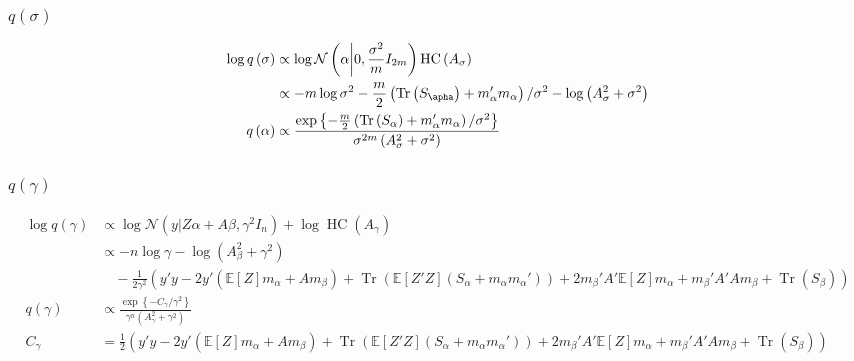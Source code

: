 \documentclass[11pt]{article}
\DeclareMathOperator{\Tr}{Tr}
\newcommand{\opn}{\operatorname}
\begin{document}
\subsubsection{$q\left(\sigma\right)$}
\begin{align*}
  \log q\left(\sigma\right) &\propto \log\mathcal{N}\left(\alpha \middle|0, \frac{\sigma^{2}}{m}I_{2m}\right)\opn{HC}\left(A_{\sigma}\right)\\
  &\propto -m\log \sigma^{2} -\frac{m}{2}\left(\Tr \left(S_{\apha}\right) +m_{\alpha}'m_{\alpha}\right)/\sigma^{2} -\log \left(A_{\sigma}^{2}+\sigma^{2}\right)\\
  q\left(\alpha\right) &\propto \frac{\exp\left\{-\frac{m}{2}\left(\Tr\left(S_{\alpha}\right) +m_{\alpha}'m_{\alpha} \right)/\sigma^{2} \right\}}{\sigma^{2m}\left(A_{\sigma}^{2}+\sigma^{2}\right)}
\end{align*}
\subsubsection{$q\left(\gamma\right)$}
\begin{align*}
  \log q\left(\gamma\right) &\propto \log \mathcal{N}\left(y|Z\alpha +A\beta, \gamma^{2}I_{n}\right) +\log \opn{HC}\left(A_{\gamma}\right)\\
  &\propto -n\log \gamma -\log \left(A_{\beta}^{2}+\gamma^{2} \right)\\
  &\quad -\frac{1}{2\gamma^{2}}\left(y'y -2y'\left(\mathbb{E}\left[Z\right]m_{\alpha} +Am_{\beta} \right) +\Tr\left(\mathbb{E}\left[Z'Z\right]\left(S_{\alpha} +m_{\alpha}m_{\alpha}' \right) \right) +2m_{\beta}'A'\mathbb{E}\left[Z\right]m_{\alpha} +m_{\beta}'A'Am_{\beta} +\Tr\left(S_{\beta}\right) \right)\\
  q\left(\gamma\right) &\propto \frac{\exp\left\{-C_{\gamma}/\gamma^{2} \right\}}{\gamma^{n}\left(A_{\gamma}^{2}+\gamma^{2}\right)}\\
  C_{\gamma} &= \frac{1}{2}\left(y'y -2y'\left(\mathbb{E}\left[Z\right]m_{\alpha} +Am_{\beta} \right) +\Tr\left(\mathbb{E}\left[Z'Z\right]\left(S_{\alpha} +m_{\alpha}m_{\alpha}' \right) \right) +2m_{\beta}'A'\mathbb{E}\left[Z\right]m_{\alpha} +m_{\beta}'A'Am_{\beta} +\Tr\left(S_{\beta}\right) \right)
\end{align*}
\end{document}
